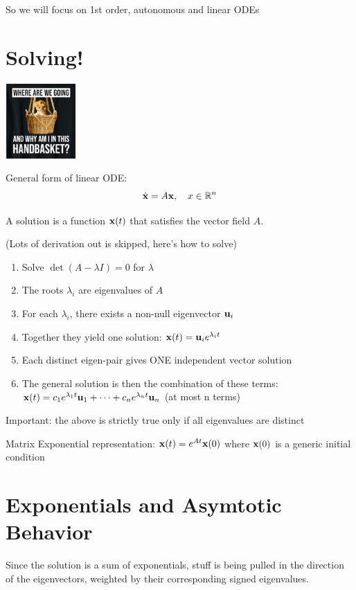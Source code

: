 So we will focus on 1st order, autonomous and linear ODEs

\section*{Solving!}
    \begin{center}
    \includegraphics[width=0.2\textwidth]{images/cat.png}
\end{center}

General form of linear ODE:
\[
\dot{\mathbf{x}} = A \mathbf{x}, \quad x \in \mathbb{R}^n
\]

A solution is a function $\mathbf{x}(t)$ that satisfies the vector field $A$.

(Lots of derivation out is skipped, here's how to solve)

\begin{enumerate}
    \item Solve $\det(A - \lambda I) = 0$ for $\lambda$
    \item The roots $\lambda_i$ are eigenvalues of $A$
    \item For each $\lambda_i$, there exists a non-null eigenvector 
    $\mathbf{u}_i$ 
    \item Together they yield one solution: $\mathbf{x}(t) = \mathbf{u}_i e^{\lambda_i t}$
    \item Each distinct eigen-pair gives ONE independent vector solution
    \item The general solution is then the combination of these terms: 
    $\mathbf{x}(t) = c_1 e^{\lambda_1 t} \mathbf{u}_1 + \dots + c_n e^{\lambda_n t} \mathbf{u}_n$ (at most n terms)
\end{enumerate}

Important: the above is strictly true only if all eigenvalues are distinct

Matrix Exponential representation: $\mathbf{x}(t) = e^{A t} \mathbf{x}(0)$ where $\mathbf{x}(0)$ is a generic initial condition

\section*{Exponentials and Asymtotic Behavior}

Since the solution is a sum of exponentials, stuff is being pulled in the direction of the eigenvectors, 
weighted by their corresponding signed eigenvalues.


